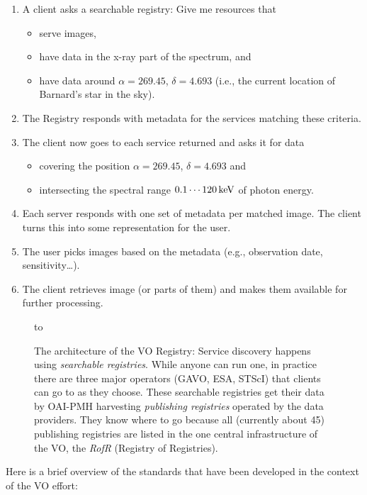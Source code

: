\begin{enumerate}
\item A client asks a searchable registry: Give me resources that
\begin{itemize}
\item serve images,
\item have data in the x-ray part of the spectrum, and
\item have data around $\alpha=269.45$, $\delta=4.693$ (i.e., the
current location of Barnard's star in the sky).
\end{itemize}
\item The Registry responds with metadata for the services 
matching these criteria.
\item The client now goes to each service returned and asks it for
data
\begin{itemize}
\item covering the position $\alpha=269.45$, $\delta=4.693$ and
\item intersecting the spectral range $0.1\cdots 120\,\rm keV$ of
photon energy.
\end{itemize}
\item Each server responds with one set of metadata per matched image. 
The client turns this into some representation for the user.
\item The user picks images based on the metadata (e.g., observation
date, sensitivity\dots).
\item The client retrieves image (or parts of them) and makes them
available for further processing.
\end{enumerate}

\begin{figure}[t]
\hbox to 

\caption{The architecture of the VO Registry: Service discovery happens
using \emph{searchable registries}.  While anyone can run one, in
practice there are three major operators (GAVO, ESA, STScI) that clients
can go to as they choose.  These searchable registries get their data by
OAI-PMH harvesting \emph{publishing registries} operated by the data
providers.  They know where to go because all (currently about 45)
publishing registries are listed in the one central infrastructure of
the VO, the \emph{RofR} (Registry of Registries).}

\label{fig:rds-regexchange}
\end{figure}

Here is a brief overview of the standards that have been developed in
the context of the VO effort:

